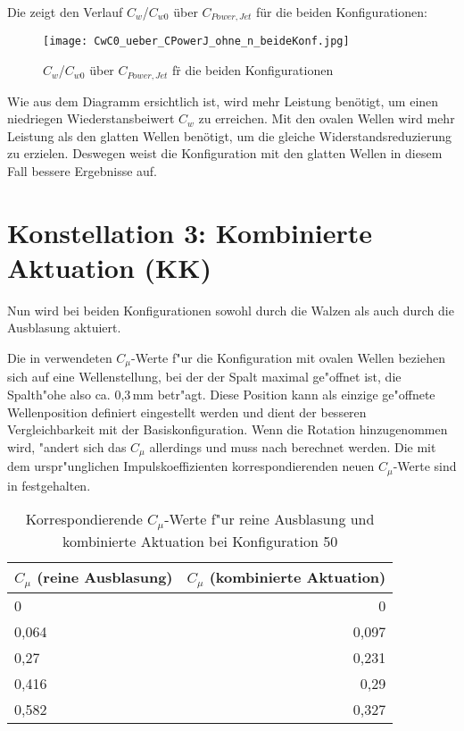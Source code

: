 Die  zeigt den Verlauf $C_{w}$/$C_{w0}$ \"uber $C_{Power,Jet}$  f\"ur die beiden Konfigurationen:
\begin{figure}[h]
	\centering
	\texttt{[image: CwC0\_ueber\_CPowerJ\_ohne\_n\_beideKonf.jpg]}
	\caption{$C_{w}$/$C_{w0}$  \"uber $C_{Power,Jet}$ f\"r die beiden Konfigurationen}
	\label{fig:Cw/Cw0-CpJet_Konf1+2}
\end{figure}

Wie aus dem Diagramm ersichtlich ist, wird mehr Leistung ben\"otigt, um einen niedriegen Wiederstansbeiwert $C_{w}$  zu erreichen. Mit den ovalen Wellen wird mehr Leistung als den glatten Wellen ben\"otigt, um die gleiche Widerstandsreduzierung zu erzielen. Deswegen weist die Konfiguration mit den glatten Wellen in diesem Fall bessere Ergebnisse auf.
\newpage

\section{Konstellation 3: Kombinierte Aktuation (KK)}
\label{s:kombinierteAkt}
Nun wird bei beiden Konfigurationen sowohl durch die Walzen als auch durch die Ausblasung aktuiert.

Die in  verwendeten $C_{\mu}$-Werte f"ur die Konfiguration mit ovalen Wellen beziehen sich auf eine Wellenstellung, bei der der Spalt maximal ge"offnet ist, die Spalth"ohe also ca. 0,3\,mm betr"agt. Diese Position kann als einzige ge"offnete Wellenposition definiert eingestellt werden und dient der besseren Vergleichbarkeit mit der Basiskonfiguration. Wenn die Rotation hinzugenommen wird, "andert sich das $C_{\mu}$ allerdings und muss nach  berechnet werden. Die mit dem urspr"unglichen Impulskoeffizienten korrespondierenden neuen $C_{\mu}$-Werte sind in  festgehalten.

\begin{table}[H]
	\centering
	\begin{tabular}{lr}
		\toprule
		$C_{\mu}$ (reine Ausblasung) & $C_{\mu}$ (kombinierte Aktuation)\\
		\midrule
		0 & 0\\
		0,064 & 0,097\\
		0,27 & 0,231\\
		0,416 & 0,29\\
		0,582 & 0,327\\
		\bottomrule
	\end{tabular}
	\caption{Korrespondierende $C_{\mu}$-Werte f"ur reine Ausblasung und kombinierte Aktuation bei Konfiguration 50}
	\label{tab:Cmu Korrektur}
\end{table}


